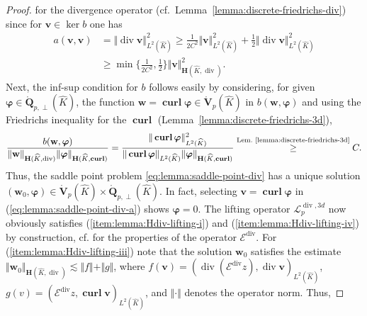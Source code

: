 \documentclass{article}
\begin{document}
\begin{proof}
for the divergence operator (cf.~Lemma~\ref{lemma:discrete-friedrichs-div}) 
since for 
$ {\mathbf v} \in \operatorname*{ker} b$ one has 
\begin{align*}
a(\mathbf{v},\mathbf{v})&=\Vert\operatorname*{div}\mathbf{v}\Vert_{L^2(\widehat{K})}^2 \geq \frac{1}{2C^2} \Vert\mathbf{v}\Vert_{L^2(\widehat{K})}^2 + \frac{1}{2}\Vert\operatorname*{div}\mathbf{v}\Vert_{L^2(\widehat{K})}^2 \\
&\geq \operatorname*{min}\{\frac{1}{2C^2},\frac{1}{2}\}\Vert\mathbf{v}\Vert_{\mathbf{H}(\widehat{K},\operatorname*{div})}^2.
\end{align*}
Next, the inf-sup condition for $b$ follows easily by considering, 
for given 
$\boldsymbol{\varphi}\in\mathring{\mathbf{Q}}_{p,\perp}(\widehat{K})$, the function 
$\mathbf{w}=\operatorname*{\mathbf{curl}}\boldsymbol{\varphi}\in\mathring{\mathbf{V}}_p(\widehat{K})$ 
in $b({\mathbf w},{\boldsymbol{\varphi}})$ and using 
the Friedrichs inequality for the $\operatorname*{\mathbf{curl}}$ (Lemma~\ref{lemma:discrete-friedrichs-3d}),
\begin{align*}
\frac{b(\mathbf{w},\boldsymbol{\varphi})}{\Vert\mathbf{w}\Vert_{\mathbf{H}(\widehat{K},\operatorname*{div})} \Vert\boldsymbol{\varphi}\Vert_{\mathbf{H}(\widehat{K},\operatorname*{\mathbf{curl}})}} = \frac{\Vert\operatorname*{\mathbf{curl}}\boldsymbol{\varphi}\Vert_{L^2(\widehat{K})}^2}{\Vert\operatorname*{\mathbf{curl}}\boldsymbol{\varphi}\Vert_{L^2(\widehat{K})} \Vert\boldsymbol{\varphi}\Vert_{\mathbf{H}(\widehat{K},\operatorname*{\mathbf{curl}})}} 
\stackrel{\text{Lem.~\ref{lemma:discrete-friedrichs-3d}}}{\geq} C. 
\end{align*}
Thus, the saddle point problem \eqref{eq:lemma:saddle-point-div} has a unique solution 
$(\mathbf{w}_0, {\boldsymbol\varphi}) \in 
\mathring{\mathbf{V}}_p(\widehat{K}) \times \mathring{\mathbf{Q}}_{p,\perp}(\widehat K)$. 
In fact, selecting ${\mathbf v} = \operatorname{\mathbf{curl}} {\boldsymbol \varphi}$ in 
(\ref{eq:lemma:saddle-point-div-a}) shows ${\boldsymbol \varphi} = 0$.
The lifting operator $\boldsymbol{\mathcal{L}}^{\operatorname*{div},3d}_p$ 
now obviously satisfies (\ref{item:lemma:Hdiv-lifting-i}) %
and (\ref{item:lemma:Hdiv-lifting-iv}) 
by construction, cf. \cite[Theorem~7.1]{demkowicz-gopalakrishnan-schoeberl-III} for the properties of 
the operator $\boldsymbol{\mathcal{E}}^{\operatorname*{div}}$. 
For (\ref{item:lemma:Hdiv-lifting-iii}) note that the solution $\mathbf{w}_0$ satisfies 
the estimate $\Vert\mathbf{w}_0\Vert_{\mathbf{H}(\widehat{K},\operatorname*{div})} \lesssim \Vert f\Vert + \Vert g\Vert$, where $f(\mathbf{v})=(\operatorname*{div}(\boldsymbol{\mathcal{E}}^{\operatorname*{div}}z),\operatorname*{div}\mathbf{v})_{L^2(\widehat{K})}$, $g(v)=(\boldsymbol{\mathcal{E}}^{\operatorname*{div}}z,\operatorname*{\mathbf{curl}} \mathbf{v})_{L^2(\widehat{K})}$, and $\Vert \cdot \Vert$ denotes the operator norm. Thus,

\end{proof}
\end{document}
